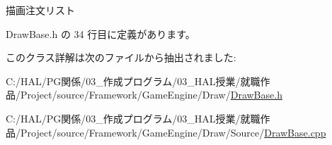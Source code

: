 描画注文リスト 



 Draw\+Base.\+h の 34 行目に定義があります。



このクラス詳解は次のファイルから抽出されました\+:\begin{DoxyCompactItemize}
\item 
C\+:/\+H\+A\+L/\+P\+G関係/03\+\_\+作成プログラム/03\+\_\+\+H\+A\+L授業/就職作品/\+Project/source/\+Framework/\+Game\+Engine/\+Draw/\mbox{\hyperlink{_draw_base_8h}{Draw\+Base.\+h}}\item 
C\+:/\+H\+A\+L/\+P\+G関係/03\+\_\+作成プログラム/03\+\_\+\+H\+A\+L授業/就職作品/\+Project/source/\+Framework/\+Game\+Engine/\+Draw/\+Source/\mbox{\hyperlink{_draw_base_8cpp}{Draw\+Base.\+cpp}}\end{DoxyCompactItemize}
